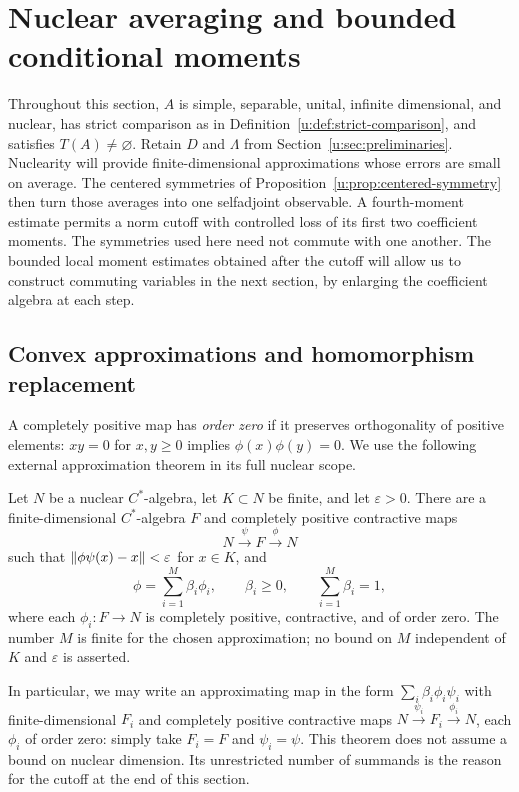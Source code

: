 \section{Nuclear averaging and bounded conditional moments}
\label{u:sec:averaging}

Throughout this section, $A$ is simple, separable, unital,
infinite dimensional, and nuclear, has strict comparison as in
Definition~\ref{u:def:strict-comparison}, and satisfies
$T(A)\ne\varnothing$.  Retain $D$ and $\Lambda$ from
Section~\ref{u:sec:preliminaries}.  Nuclearity will provide
finite-dimensional approximations whose errors are small on average.
The centered symmetries of Proposition~\ref{u:prop:centered-symmetry}
then turn those averages into one selfadjoint observable.  A fourth-moment
estimate permits a norm cutoff with controlled loss of its first two
coefficient moments.  The symmetries used here need not commute with
one another.  The bounded local moment estimates obtained after the
cutoff will allow us to construct commuting variables in the next
section, by enlarging the coefficient algebra at each step.

\subsection{Convex approximations and homomorphism replacement}

A completely positive map has \emph{order zero} if it preserves
orthogonality of positive elements: $xy=0$ for $x,y\ge0$ implies
$\phi(x)\phi(y)=0$.  We use the following external approximation theorem
in its full nuclear scope.

\begin{theorem}
\label{u:thm:hkw-approximation}
Let $N$ be a nuclear $C^*$-algebra, let $K\subset N$ be finite, and let
$\varepsilon>0$.  There are a finite-dimensional $C^*$-algebra $F$ and
completely positive contractive maps
\[
 N\xrightarrow{\psi}F\xrightarrow{\phi}N
\]
such that $\lVert\phi\psi(x)-x\rVert<\varepsilon$ for $x\in K$, and
\[
 \phi=\sum_{i=1}^{M}\beta_i\phi_i,
 \qquad \beta_i\ge0,\qquad \sum_{i=1}^{M}\beta_i=1,
\]
where each $\phi_i:F\to N$ is completely positive, contractive, and of
order zero.  The number $M$ is finite for the chosen approximation;
no bound on $M$ independent of $K$ and $\varepsilon$ is asserted.
\end{theorem}

In particular, we may write an approximating map in the form
$\sum_i\beta_i\phi_i\psi_i$ with finite-dimensional $F_i$ and completely
positive contractive maps $N\xrightarrow{\psi_i}F_i
\xrightarrow{\phi_i}N$, each $\phi_i$ of order zero: simply take
$F_i=F$ and $\psi_i=\psi$.  This theorem does not assume a bound on nuclear
dimension.  Its unrestricted number of summands is the reason for the
cutoff at the end of this section.

